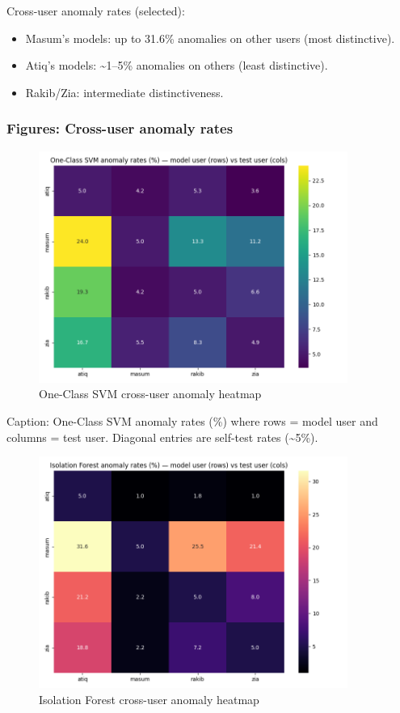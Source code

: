 \documentclass[
  11pt,
  a4paper,
]{article}
\providecommand{\tightlist}{%
  \setlength{\itemsep}{0pt}\setlength{\parskip}{0pt}}
\begin{document}
Cross-user anomaly rates (selected):

\begin{itemize}
\tightlist
\item
  Masum's models: up to 31.6\% anomalies on other users (most
  distinctive).
\item
  Atiq's models: \textasciitilde1--5\% anomalies on others (least
  distinctive).
\item
  Rakib/Zia: intermediate distinctiveness.
\end{itemize}

\subsubsection{Figures: Cross-user anomaly
rates}\label{figures-cross-user-anomaly-rates}

\begin{figure}
\centering
\includegraphics[width=0.9\textwidth,height=\textheight]{figures/svm_cross_user_heatmap.png}
\caption{One-Class SVM cross-user anomaly heatmap}
\end{figure}

Caption: One-Class SVM anomaly rates (\%) where rows = model user and
columns = test user. Diagonal entries are self-test rates
(\textasciitilde5\%).

\begin{figure}
\centering
\includegraphics[width=0.9\textwidth,height=\textheight]{figures/iso_cross_user_heatmap.png}
\caption{Isolation Forest cross-user anomaly heatmap}
\end{figure}
\end{document}
